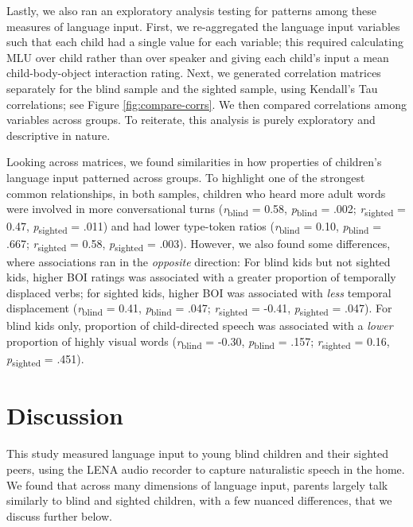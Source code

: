 \documentclass[
  man,floatsintext]{apa6}
\begin{document}
Lastly, we also ran an exploratory analysis testing for patterns among these measures of language input. First, we re-aggregated the language input variables such that each child had a single value for each variable; this required calculating MLU over child rather than over speaker and giving each child's input a mean child-body-object interaction rating. Next, we generated correlation matrices separately for the blind sample and the sighted sample, using Kendall's Tau correlations; see Figure \ref{fig:compare-corrs}. We then compared correlations among variables across groups. To reiterate, this analysis is purely exploratory and descriptive in nature.

Looking across matrices, we found similarities in how properties of children's language input patterned across groups. To highlight one of the strongest common relationships, in both samples, children who heard more adult words were involved in more conversational turns (\emph{r}\textsubscript{blind} = 0.58, \emph{p}\textsubscript{blind} = .002; \emph{r}\textsubscript{sighted} = 0.47, \emph{p}\textsubscript{sighted} = .011) and had lower type-token ratios (\emph{r}\textsubscript{blind} = 0.10, \emph{p}\textsubscript{blind} = .667; \emph{r}\textsubscript{sighted} = 0.58, \emph{p}\textsubscript{sighted} = .003). However, we also found some differences, where associations ran in the \emph{opposite} direction: For blind kids but not sighted kids, higher BOI ratings was associated with a greater proportion of temporally displaced verbs; for sighted kids, higher BOI was associated with \emph{less} temporal displacement (\emph{r}\textsubscript{blind} = 0.41, \emph{p}\textsubscript{blind} = .047; \emph{r}\textsubscript{sighted} = -0.41, \emph{p}\textsubscript{sighted} = .047). For blind kids only, proportion of child-directed speech was associated with a \emph{lower} proportion of highly visual words (\emph{r}\textsubscript{blind} = -0.30, \emph{p}\textsubscript{blind} = .157; \emph{r}\textsubscript{sighted} = 0.16, \emph{p}\textsubscript{sighted} = .451).

\hypertarget{discussion}{%
\section{Discussion}\label{discussion}}

This study measured language input to young blind children and their sighted peers, using the LENA audio recorder to capture naturalistic speech in the home. We found that across many dimensions of language input, parents largely talk similarly to blind and sighted children, with a few nuanced differences, that we discuss further below.
\end{document}
